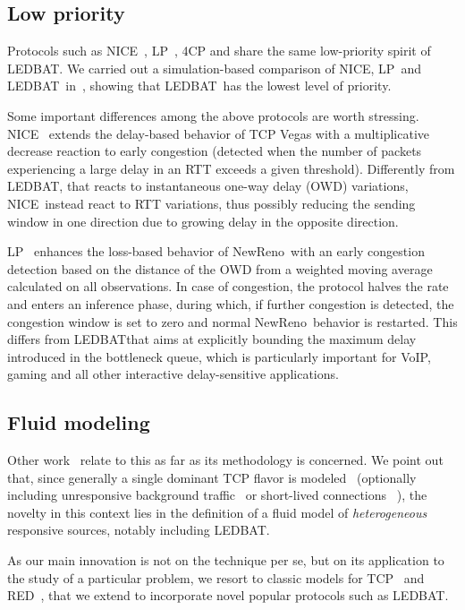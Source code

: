 \documentclass[conference]{IEEEtran}
\newcommand{\reno}[0]{NewReno}
\newcommand{\lp}[0]{LP}
\newcommand{\nice}[0]{NICE}
\newcommand{\ledbat}[0]{LEDBAT}
\newcommand{\btledbat}[0]{\ledbat}
\begin{document}
\subsection{Low priority}

Protocols such as NICE~\cite{tcp_nice}, LP~\cite{tcp_lp}, 4CP\cite{tcp_4cp} and \cite{tcp_key} share the same low-priority spirit of \ledbat. We carried out a simulation-based comparison of \nice, \lp\ and \ledbat\ in~\cite{lcn10}, showing that \btledbat\ has the lowest level of priority.

Some important differences among the above protocols are worth stressing. \nice~\cite{tcp_nice} extends the delay-based behavior of TCP Vegas with a multiplicative decrease reaction to early congestion (detected when the number of packets experiencing a large delay in an RTT exceeds a given threshold). Differently from \ledbat, that reacts to instantaneous one-way delay (OWD) variations, \nice\ instead react to RTT variations, thus possibly reducing the sending window in one direction due to growing delay in the opposite direction.

\lp~\cite{tcp_lp} enhances the loss-based behavior of \reno\ with an early congestion detection based on the distance of the OWD from a weighted moving average calculated on all observations. In case of congestion, the protocol halves the rate and enters an
inference phase, during which, if further congestion is detected, the congestion window is set to zero and normal \reno\ behavior is restarted. This differs from \ledbat that aims at explicitly bounding the maximum delay introduced in the bottleneck queue, which is particularly important for VoIP, gaming and all other interactive delay-sensitive applications.


\subsection{Fluid modeling}

Other work~\cite{misra00sigcomm,hollot01infocom,liu03sigmetrics,marsan05ton} relate to this as far as its methodology is concerned.
We point out that, since generally a single dominant TCP flavor is modeled~\cite{misra00sigcomm,hollot01infocom} (optionally including unresponsive background traffic~\cite{liu03sigmetrics} or short-lived connections ~\cite{marsan05ton}), the novelty in this context lies in the definition of a fluid model of \emph{heterogeneous} responsive sources, notably including LEDBAT.

As our main innovation is not on the technique per se, but on its application to the study of a particular problem, we resort to classic models for TCP~\cite{liu03sigmetrics} and RED~\cite{misra00sigcomm}, that we extend to incorporate novel popular protocols such as LEDBAT.
\end{document}
